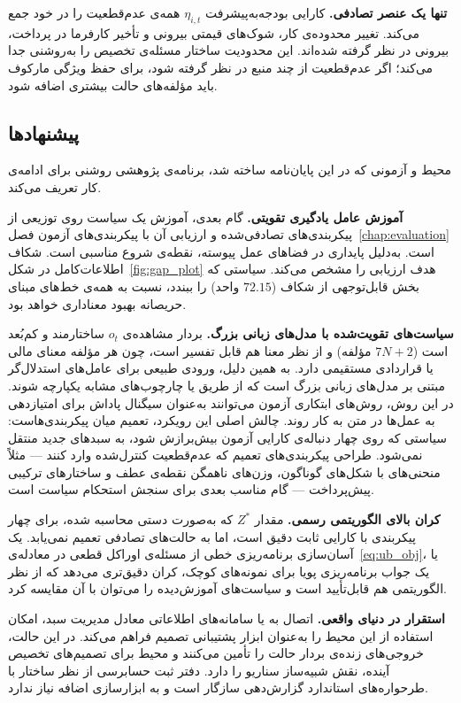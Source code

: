 \textbf{تنها یک عنصر تصادفی.} کارایی بودجه‌به‌پیشرفت $\eta_{i,t}$
همه‌ی عدم‌قطعیت را در خود جمع می‌کند. تغییر محدوده‌ی کار، شوک‌های
قیمتی بیرونی و تأخیر کارفرما در پرداخت، بیرونی در نظر گرفته
شده‌اند. این محدودیت ساختار مسئله‌ی تخصیص را به‌روشنی جدا می‌کند؛
اگر عدم‌قطعیت از چند منبع در نظر گرفته شود، برای حفظ ویژگی مارکوف
باید مؤلفه‌های حالت بیشتری اضافه شود.

\subsection{پیشنهادها}
\label{subsec:future}

محیط و آزمونی که در این پایان‌نامه ساخته شد، برنامه‌ی پژوهشی روشنی
برای ادامه‌ی کار تعریف می‌کند.

\textbf{آموزش عامل یادگیری تقویتی.}
گام بعدی، آموزش یک سیاست روی توزیعی از پیکربندی‌های تصادفی‌شده
و ارزیابی آن با پیکربندی‌های آزمون فصل~\ref{chap:evaluation} است.
 \citep{Schulman2017} به‌دلیل پایداری در فضاهای عمل پیوسته،
نقطه‌ی شروع مناسبی است. شکاف اطلاعات‌کامل در
شکل~\ref{fig:gap_plot} هدف ارزیابی را مشخص می‌کند. سیاستی که بخش
قابل‌توجهی از شکاف  ($72.15$ واحد) را ببندد،
نسبت به همه‌ی خط‌های مبنای حریصانه بهبود معناداری خواهد بود.

\textbf{سیاست‌های تقویت‌شده با مدل‌های زبانی بزرگ.}
بردار مشاهده‌ی $o_t$ ساختارمند و کم‌بُعد است ($7N+2$ مؤلفه) و از
نظر معنا هم قابل تفسیر است، چون هر مؤلفه معنای مالی یا قراردادی
مستقیمی دارد. به همین دلیل، ورودی طبیعی برای عامل‌های استدلال‌گر
مبتنی بر مدل‌های زبانی بزرگ است که از طریق  یا
چارچوب‌های مشابه یکپارچه شوند. در این روش، روش‌های ابتکاری آزمون
می‌توانند به‌عنوان سیگنال پاداش برای امتیازدهی به عمل‌ها در متن
به کار روند. چالش اصلی این رویکرد، تعمیم میان پیکربندی‌هاست:
سیاستی که روی چهار دنباله‌ی کارایی آزمون بیش‌برازش شود، به
سبدهای جدید منتقل نمی‌شود. طراحی پیکربندی‌های تعمیم که
عدم‌قطعیت کنترل‌شده وارد کنند — مثلاً منحنی‌های  با
شکل‌های گوناگون، وزن‌های ناهمگن نقطه‌ی عطف و ساختارهای ترکیبی
پیش‌پرداخت — گام مناسب بعدی برای سنجش استحکام سیاست است.

\textbf{کران بالای الگوریتمی رسمی.}
مقدار $Z^*$ که به‌صورت دستی محاسبه شده، برای چهار پیکربندی با
کارایی ثابت دقیق است، اما به حالت‌های تصادفی تعمیم نمی‌یابد. یک
آسان‌سازی برنامه‌ریزی خطی از مسئله‌ی اوراکل قطعی در
معادله‌ی~\eqref{eq:ub_obj}، یا یک جواب برنامه‌ریزی پویا برای
نمونه‌های کوچک، کران دقیق‌تری می‌دهد که از نظر الگوریتمی هم
قابل‌تأیید است و سیاست‌های آموزش‌دیده را می‌توان با آن مقایسه کرد.

\textbf{استقرار در دنیای واقعی.}
اتصال به  یا سامانه‌های اطلاعاتی معادل
مدیریت سبد، امکان استفاده از این محیط را به‌عنوان ابزار پشتیبانی
تصمیم فراهم می‌کند. در این حالت، خروجی‌های زنده‌ی 
بردار حالت را تأمین می‌کنند و محیط برای تصمیم‌های تخصیص آینده، نقش
شبیه‌ساز سناریو را دارد. دفتر ثبت حسابرسی  از نظر
ساختار با طرحواره‌های استاندارد گزارش‌دهی  سازگار است و
به ابزارسازی اضافه نیاز ندارد.